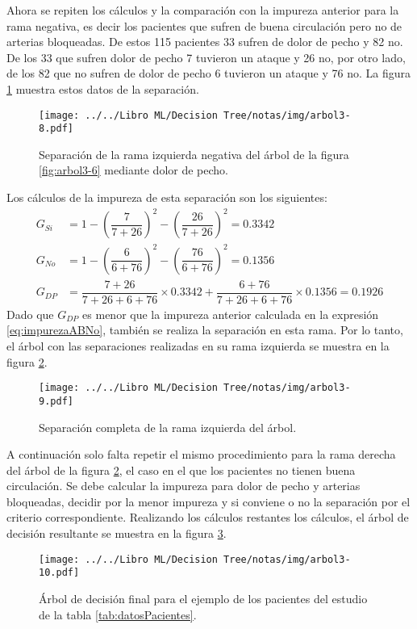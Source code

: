 \documentclass[
10pt, %
a4paper, %
]{article}
\begin{document}
Ahora se repiten los cálculos y la comparación con la impureza anterior para la rama negativa, es decir los pacientes que sufren de buena circulación pero no de arterias
bloqueadas. De estos 115 pacientes 33 sufren de dolor de pecho y 82 no. De los 33 que sufren dolor de pecho 7 tuvieron un ataque y 26 no, por otro lado, de los 82 que no sufren 
de dolor de pecho 6 tuvieron un ataque y 76 no. La figura \ref{fig:arbol3-8} muestra estos datos de la separación.
\begin{figure}[H]
	\centering
	\texttt{[image: ../../Libro ML/Decision Tree/notas/img/arbol3-8.pdf]}
	\caption{Separación de la rama izquierda negativa del árbol de la figura \ref{fig:arbol3-6} mediante dolor de pecho.}
	\label{fig:arbol3-8}
\end{figure}
Los cálculos de la impureza de esta separación son los siguientes:
\begin{align*}
	G_{Si} &= 1 - \left(\dfrac{7}{7+26}\right)^2 - \left(\dfrac{26}{7+26}\right)^2 = 0.3342\\
	G_{No} &= 1 - \left(\dfrac{6}{6+76}\right)^2 - \left(\dfrac{76}{6+76}\right)^2 = 0.1356\\
	G_{DP} &= \dfrac{7+26}{7+26+6+76}\times 0.3342 + \dfrac{6+76}{7+26+6+76}\times 0.1356 = 0.1926
\end{align*}
Dado que $G_{DP}$ es menor que la impureza anterior calculada en la expresión \ref{eq:impurezaABNo}, también se realiza la separación en esta rama. Por lo tanto, el árbol con 
las separaciones realizadas en su rama izquierda se muestra en la figura \ref{fig:arbol3-9}.

\begin{figure}[H]
	\centering
	\texttt{[image: ../../Libro ML/Decision Tree/notas/img/arbol3-9.pdf]}
	\caption{Separación completa de la rama izquierda del árbol.}
	\label{fig:arbol3-9}
\end{figure}

A continuación solo falta repetir el mismo procedimiento para la rama derecha del árbol de la figura \ref{fig:arbol3-9}, el caso en el que los pacientes no tienen buena 
circulación. Se debe calcular la impureza para dolor de pecho y arterias bloqueadas, decidir por la menor impureza y si conviene o no la separación por el criterio
correspondiente. Realizando los cálculos restantes los cálculos, el árbol de decisión resultante se muestra en la figura \ref{fig:arbol3-10}. 

\begin{figure}[H]
	\centering
	\texttt{[image: ../../Libro ML/Decision Tree/notas/img/arbol3-10.pdf]}
	\caption{Árbol de decisión final para el ejemplo de los pacientes del estudio de la tabla \ref{tab:datosPacientes}.}
	\label{fig:arbol3-10}
\end{figure}
\end{document}
